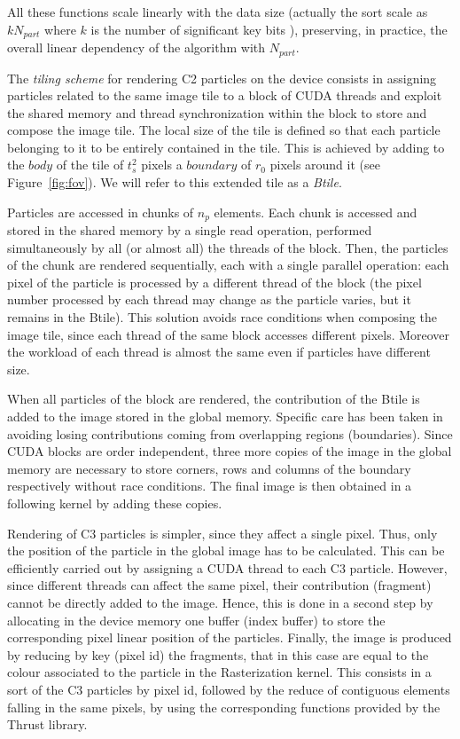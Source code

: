 \documentclass[11pt]{article}
\begin{document}
All these functions scale linearly with the data size (actually the sort scale 
as $kN_{part}$ where $k$ is the number of significant key bits \cite{RadixSort}),
preserving, in practice, the overall linear dependency of the algorithm with $N_{part}$.

The \textit{tiling scheme} for rendering C2 particles on the device consists in 
assigning particles related to the same image tile to a block of CUDA threads 
and exploit the shared memory and thread synchronization within the block to store 
and compose the image tile. The local size of the tile is defined so that each particle 
belonging to it to be entirely contained in the tile. This is achieved by 
adding to the $body$ of the tile of $t_s^2$ pixels a $boundary$ of $r_0$ pixels around it (see Figure~\ref{fig:fov}). We will refer to this extended tile as a \textit{Btile}.

Particles are accessed in chunks of $n_p$ elements. Each chunk is accessed and stored 
in the shared memory by a single read operation, performed simultaneously by all (or almost all) the threads of the block. Then, the particles of the chunk are rendered sequentially, each with a single parallel operation: each pixel of the particle is processed by a different thread of the block (the pixel number processed by each thread may change as the particle varies, but it remains in the Btile). 
This solution avoids race conditions when composing the image tile, since each 
thread of the same block accesses different pixels. Moreover the workload of each 
thread is almost the same even if particles have different size.

When all particles of the block are rendered, the contribution of the Btile 
is added to the image stored in the global memory. 
Specific care has been taken in avoiding losing contributions coming 
from overlapping regions (boundaries). Since CUDA blocks are order independent, three more copies of the image in the global memory are necessary to store corners, rows and columns of the boundary respectively without race conditions. The final image is then obtained in a following kernel by adding these copies.

Rendering of C3 particles is simpler, since they affect a single pixel. 
Thus, only the position of the particle in the global image has to be calculated.
This can be efficiently carried out by assigning a CUDA thread to each C3 particle. 
However, since different threads can affect the same pixel, their contribution (fragment) cannot be directly added to the image. Hence, this is done in a second step by allocating in the device memory one buffer (index buffer) to store the corresponding pixel linear position of the particles. Finally, the image is produced by reducing by key (pixel id) the fragments, that in this case are equal to the colour associated to the particle in the Rasterization kernel. This consists in a sort of the C3 particles by pixel id, followed by the reduce of 
contiguous elements falling in the same pixels, by using the corresponding 
functions provided by the Thrust library.
\end{document}
